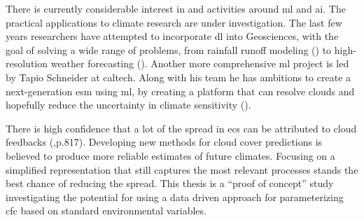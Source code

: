 There is currently considerable interest in and activities around \acrfull{ml} and \acrshort{ai}. The practical applications to climate research are under investigation. The last few years researchers have attempted to incorporate \acrshort{dl} into Geosciences, with the goal of solving a wide range of problems, from rainfall runoff modeling (\cite{hess-23-5089-2019}) to  high-resolution weather forecasting (\cite{Rodrigues2018DeepDownscale:Forecast}). Another more comprehensive \acrshort{ml} project is led by Tapio Schneider at \acrfull{caltech}. Along with his team he has ambitions to create a next-generation \acrfull{esm} using \acrshort{ml}, by creating a platform that can resolve clouds and hopefully reduce the uncertainty in climate sensitivity (\cite{Voosen2018ScienceIntelligence}).

There is high confidence that a lot of the spread in \acrshort{ecs} can be attributed to cloud feedbacks (\cite{IPCC_CH9_climate_models},p.817). Developing new methods for cloud cover predictions is believed to produce more reliable estimates of future climates. Focusing on a simplified representation that still captures the most relevant processes stands the best chance of reducing the spread. This thesis is a ``proof of concept'' study investigating the potential for using a data driven approach for parameterizing \acrfull{cfc} based on standard environmental variables. 


